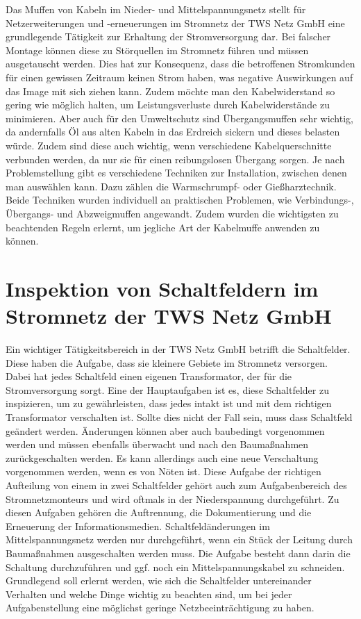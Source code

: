 Das Muffen von Kabeln im Nieder- und Mittelspannungsnetz stellt für Netzerweiterungen und -erneuerungen im Stromnetz der TWS Netz GmbH eine grundlegende 
Tätigkeit zur Erhaltung der Stromversorgung dar. Bei falscher Montage können diese zu Störquellen im Stromnetz führen und müssen ausgetauscht werden. Dies 
hat zur Konsequenz, dass die betroffenen Stromkunden für einen gewissen Zeitraum keinen Strom haben, was negative Auswirkungen auf das Image mit sich ziehen 
kann. Zudem möchte man den Kabelwiderstand so gering wie möglich halten, um Leistungsverluste durch Kabelwiderstände zu minimieren. Aber auch für den 
Umweltschutz sind \zB Übergangsmuffen sehr wichtig, da andernfalls Öl aus alten Kabeln in das Erdreich sickern und dieses belasten würde. Zudem sind diese 
auch wichtig, wenn verschiedene Kabelquerschnitte verbunden werden, da nur sie für einen reibungslosen Übergang sorgen. Je nach Problemstellung gibt es 
verschiedene Techniken zur Installation, zwischen denen man auswählen kann. Dazu zählen die Warmschrumpf- oder Gießharztechnik. Beide Techniken wurden 
individuell an praktischen Problemen, wie \zB Verbindungs-, Übergangs- und Abzweigmuffen angewandt. Zudem wurden die wichtigsten zu beachtenden Regeln 
erlernt, um jegliche Art der Kabelmuffe anwenden zu können.
\clearpage

\section{Inspektion von Schaltfeldern im Stromnetz der TWS Netz GmbH}

Ein wichtiger Tätigkeitsbereich in der TWS Netz GmbH betrifft die Schaltfelder. Diese haben die Aufgabe, dass sie kleinere Gebiete im Stromnetz versorgen. 
Dabei hat jedes Schaltfeld einen eigenen Transformator, der für die Stromversorgung sorgt. Eine der Hauptaufgaben ist es, diese Schaltfelder zu inspizieren, 
um zu gewährleisten, dass jedes intakt ist und mit dem richtigen Transformator verschalten ist. Sollte dies nicht der Fall sein, muss dass Schaltfeld geändert 
werden. Änderungen können aber auch baubedingt vorgenommen werden und müssen ebenfalls überwacht und nach den Baumaßnahmen zurückgeschalten werden. Es kann 
allerdings auch eine neue Verschaltung vorgenommen werden, wenn es von Nöten ist. Diese Aufgabe der richtigen Aufteilung von einem in zwei Schaltfelder 
gehört auch zum Aufgabenbereich des Stromnetzmonteurs und wird oftmals in der Niederspannung durchgeführt. Zu diesen Aufgaben gehören \zB die Auftrennung, 
die Dokumentierung und die Erneuerung der Informationsmedien. Schaltfeldänderungen im Mittelspannungsnetz werden nur durchgeführt, wenn ein Stück der 
Leitung durch Baumaßnahmen ausgeschalten werden muss. Die Aufgabe besteht dann darin die Schaltung durchzuführen und ggf. noch ein Mittelspannungskabel zu 
schneiden. Grundlegend soll erlernt werden, wie sich die Schaltfelder untereinander Verhalten und welche Dinge wichtig zu beachten sind, um bei jeder 
Aufgabenstellung eine möglichst geringe Netzbeeinträchtigung zu haben. 
\clearpage

